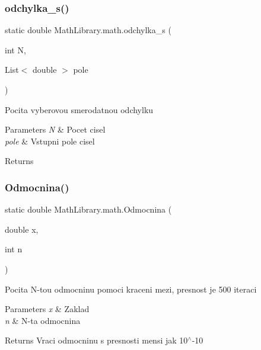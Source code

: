 \subsubsection{\texorpdfstring{odchylka\+\_\+s()}{odchylka\_s()}}
{\footnotesize\ttfamily static double Math\+Library.\+math.\+odchylka\+\_\+s (\begin{DoxyParamCaption}\item[{int}]{N,  }\item[{List$<$ double $>$}]{pole }\end{DoxyParamCaption})\hspace{0.3cm}{\ttfamily [static]}}



Pocita vyberovou smerodatnou odchylku 


\begin{DoxyParams}{Parameters}
{\em N} & Pocet cisel\\
\hline
{\em pole} & Vstupni pole cisel\\
\hline
\end{DoxyParams}
\begin{DoxyReturn}{Returns}

\end{DoxyReturn}
\mbox{\label{class_math_library_1_1math_aa28f90e3e657831aa9d634f1d0410413}} 
\subsubsection{\texorpdfstring{Odmocnina()}{Odmocnina()}}
{\footnotesize\ttfamily static double Math\+Library.\+math.\+Odmocnina (\begin{DoxyParamCaption}\item[{double}]{x,  }\item[{int}]{n }\end{DoxyParamCaption})\hspace{0.3cm}{\ttfamily [static]}}



Pocita N-\/tou odmocninu pomoci kraceni mezi, presnost je 500 iteraci 


\begin{DoxyParams}{Parameters}
{\em x} & Zaklad\\
\hline
{\em n} & N-\/ta odmocnina\\
\hline
\end{DoxyParams}
\begin{DoxyReturn}{Returns}
Vraci odmocninu s presnosti mensi jak 10$^\wedge$-\/10
\end{DoxyReturn}
\mbox{\label{class_math_library_1_1math_a4cd9b49df0b6f0073c95c95b3f0e6e2f}} 
